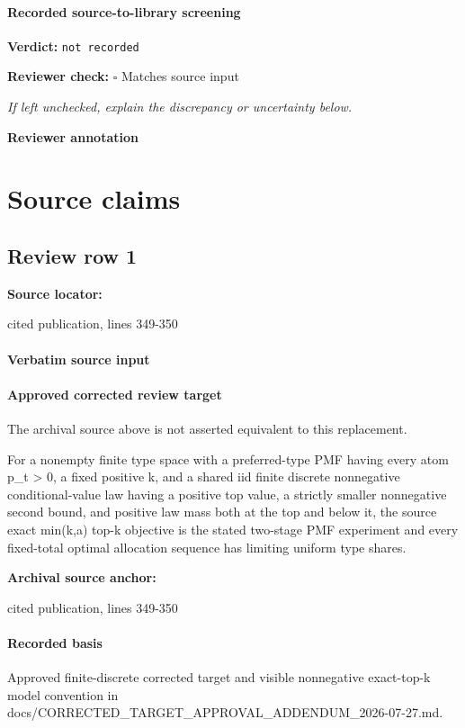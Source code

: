 \documentclass[10pt]{article}
\newcommand{\reviewerbox}{%
  \par\noindent\fbox{\parbox{0.96\linewidth}{\rule{0pt}{0.38in}}}\par
}
\newcommand{\reviewmatch}[1]{%
  \par\noindent\textbf{Reviewer check:} $\square$\; #1\par
  \noindent\emph{If left unchecked, explain the discrepancy or uncertainty below.}\par
}
\begin{document}
\paragraph{Recorded source-to-library screening}
\textbf{Verdict:} \texttt{not recorded}
\reviewmatch{Matches source input}
\noindent\textbf{Reviewer annotation}\par
\reviewerbox

\clearpage
\hypertarget{source-claim-f5a7e9fe26a022aa}{}
\hypertarget{source-section-f10b5f68e4acf3dc}{}
\section*{Source claims}
\subsection*{Review row 1}
\textbf{Source locator:} {\footnotesize\raggedright cited publication, lines 349-\allowbreak{}350\par}
\paragraph{Verbatim source input}
\begin{ReviewVerbatim}
\end{ReviewVerbatim}

\paragraph{Approved corrected review target}
The archival source above is not asserted equivalent to this replacement.
\begin{ReviewVerbatim}
For a nonempty finite type space with a preferred-type PMF having every atom p_t > 0, a fixed positive k, and a shared iid finite discrete nonnegative conditional-value law having a positive top value, a strictly smaller nonnegative second bound, and positive law mass both at the top and below it, the source exact min(k,a) top-k objective is the stated two-stage PMF experiment and every fixed-total optimal allocation sequence has limiting uniform type shares.
\end{ReviewVerbatim}

\textbf{Archival source anchor:} {\footnotesize\raggedright cited publication, lines 349-\allowbreak{}350\par}
\paragraph{Recorded basis}
Approved finite-\allowbreak{}discrete corrected target and visible nonnegative exact-\allowbreak{}top-\allowbreak{}k model convention in docs/\allowbreak{}CORRECTED\_\allowbreak{}TARGET\_\allowbreak{}APPROVAL\_\allowbreak{}ADDENDUM\_\allowbreak{}2026-\allowbreak{}07-\allowbreak{}27.\allowbreak{}md.\allowbreak{}
\end{document}
